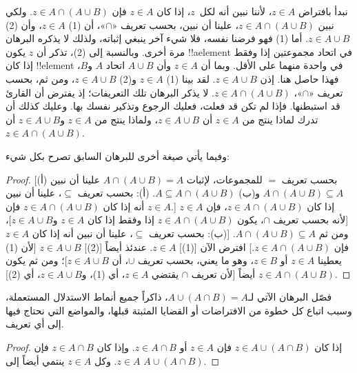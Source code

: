 \documentclass[../../../include/open-logic-section]{subfiles}
\begin{document}
نبدأ بافتراض $z \in A$، لأننا نبين أنه لكل~$z$، إذا كان $z \in A$
فإن $z \in A \cap (A \cup B)$. ولكي نبين
$z \in A \cap (A \cup B)$، علينا أن نبين، بحسب تعريف «$\cap$»، أن
(1) $z \in A$، وأن (2) $z \in A \cup B$. أما (1) فهو فرضنا نفسه، فلا
شيء آخر ينبغي إثباته، ولذلك لا يذكره البرهان مرة أخرى. وبالنسبة إلى (2)،
تذكر أن $z$ يكون !!a{element} في اتحاد مجموعتين إذا وفقط إذا كان
!!{element} في واحدة منهما على الأقل. وبما أن $z \in A$ وأن
$A \cup B$ اتحاد $A$ و$B$، فهذا حاصل هنا. إذن $z \in A \cup B$.
لقد بينا (1) $z \in A$ و(2) $z \in A \cup B$، ومن ثم، بحسب تعريف
«$\cap$»، $z \in A \cap (A \cup B)$. لا يذكر البرهان تلك التعريفات؛
إذ يفترض أن القارئ قد استبطنها. فإذا لم تكن قد فعلت، فعليك الرجوع
وتذكير نفسك بها. وعليك كذلك أن تدرك لماذا ينتج من $z \in A$ أن
$z \in A \cup B$، ولماذا ينتج من $z \in A$ و$z \in A \cup B$ أن
$z \in A \cap (A \cup B)$.

وفيما يأتي صيغة أخرى للبرهان السابق تصرح بكل شيء:
\begin{proof}{}
[بحسب تعريف $=$ للمجموعات، لإثبات $A \cap (A \cup B) = A$ علينا أن
  نبين (أ) $A \cap (A \cup B) \subseteq A$ و(ب)
  $A \subseteq A \cap (A \cup B)$. (أ): بحسب تعريف $\subseteq$، علينا
  أن نبين أنه إذا كان $z \in A \cap (A \cup B)$ فإن $z \in A$.]
إذا كان $z \in A \cap (A \cup B)$، فإن $z \in A$ [لأنه بحسب تعريف
$\cap$، يكون $z \in A \cap (A \cup B)$ إذا وفقط إذا كان $z \in A$
و$z \in A \cup B$]، ومن ثم $A \cap (A \cup B) \subseteq A$.
[(ب): بحسب تعريف $\subseteq$، علينا أن نبين أنه إذا كان $z \in A$ فإن
$z \in A \cap (A \cup B)$.] افترض الآن [(1)] $z \in A$. عندئذ أيضاً
[(2)] $z \in A \cup B$ [لأن (1) يعطينا $z \in A$ أو $z \in B$،
وهو ما يعني، بحسب تعريف $\cup$، أن $z \in A \cup B$]؛ ومن ثم يكون
$z \in A \cap (A \cup B)$ أيضاً [لأن تعريف $\cap$ يقتضي
$z \in A$، أي (1)، و$z \in A \cup B$، أي (2)].
\end{proof}

\begin{prob}
فصّل البرهان الآتي لـ$A \cup (A \cap B) = A$، ذاكراً جميع أنماط
الاستدلال المستعملة، وسبب اتباع كل خطوة من الافتراضات أو القضايا المثبتة
قبلها، والمواضع التي نحتاج فيها إلى أي تعريف.
\begin{proof}
  إذا كان $z \in A \cup (A \cap B)$ فإن $z \in A$ أو
  $z \in A \cap B$. وإذا كان $z \in A \cap B$ فإن $z \in A$. وكل
  $z \in A$ ينتمي أيضاً إلى $A \cup (A \cap B)$.
\end{proof}
\end{prob}
\end{document}
